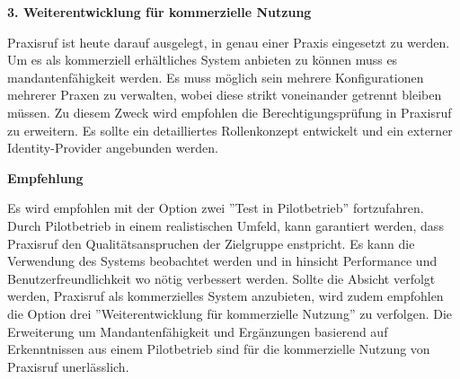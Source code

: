 \textbf{3. Weiterentwicklung für kommerzielle Nutzung}

Praxisruf ist heute darauf ausgelegt, in genau einer Praxis eingesetzt zu werden.
Um es als kommerziell erhältliches System anbieten zu können muss es mandantenfähigkeit werden.
Es muss möglich sein mehrere Konfigurationen mehrerer Praxen zu verwalten, wobei diese strikt voneinander getrennt bleiben müssen.
Zu diesem Zweck wird empfohlen die Berechtigungsprüfung in Praxisruf zu erweitern.
Es sollte ein detailliertes Rollenkonzept entwickelt und ein externer Identity-Provider angebunden werden.

\textbf{Empfehlung}

Es wird empfohlen mit der Option zwei ''Test in Pilotbetrieb'' fortzufahren.
Durch Pilotbetrieb in einem realistischen Umfeld, kann garantiert werden, dass Praxisruf den Qualitätsanspruchen der Zielgruppe enstpricht.
Es kann die Verwendung des Systems beobachtet werden und in hinsicht Performance und Benutzerfreundlichkeit wo nötig verbessert werden.
Sollte die Absicht verfolgt werden, Praxisruf als kommerzielles System anzubieten, wird zudem empfohlen die Option drei ''Weiterentwicklung für kommerzielle Nutzung'' zu verfolgen.
Die Erweiterung um Mandantenfähigkeit und Ergänzungen basierend auf Erkenntnissen aus einem Pilotbetrieb sind für die kommerzielle Nutzung von Praxisruf unerlässlich.

\clearpage
